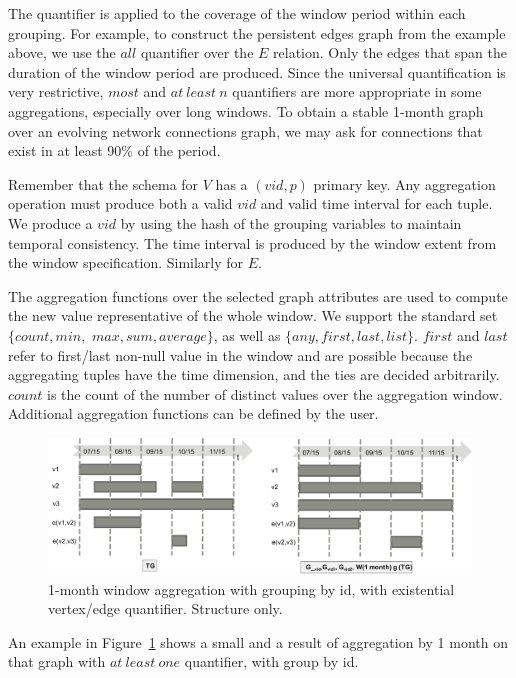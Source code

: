 The quantifier is applied to the coverage of the window period within
each grouping.  For example, to construct the persistent edges graph
from the example above, we use the $all$ quantifier over the $E$ relation.
Only the edges that span the duration of the window period are
produced.  Since the universal quantification is very restrictive,
$most$ and $at\ least\ n$ quantifiers are more appropriate in some
aggregations, especially over long windows.  To obtain a stable
1-month graph over an evolving network connections graph, we may ask
for connections that exist in at least 90\% of the period.

Remember that the schema for $V$ has a $(vid, p)$ primary key.  Any
aggregation operation must produce both a valid $vid$ and valid time
interval for each tuple.  We produce a $vid$ by using the hash of the
grouping variables to maintain temporal consistency.  The time
interval is produced by the window extent from the window
specification. Similarly for $E$.

The aggregation functions over the selected graph attributes are used
to compute the new value representative of the whole window.  We
support the standard set $\{count, min,$ $max, sum, average\}$, as
well as $\{any, first, last, list\}$.  $first$ and $last$ refer to
first/last non-null value in the window and are possible because the
aggregating tuples have the time dimension, and the ties are decided
arbitrarily.  $count$ is the count of the number of distinct values
over the aggregation window.  Additional aggregation functions can be
defined by the user.

\begin{figure}
\includegraphics[width=6.5in]{figs/agg1.pdf}
\caption{1-month window aggregation with grouping by id, with
  existential vertex/edge quantifier.  Structure only.}
\label{fig:agg1}
\end{figure}

An example in Figure~\ref{fig:agg1} shows a small \tg and a result of
aggregation by 1 month on that graph with $at\ least\ one$ quantifier,
with group by id.

